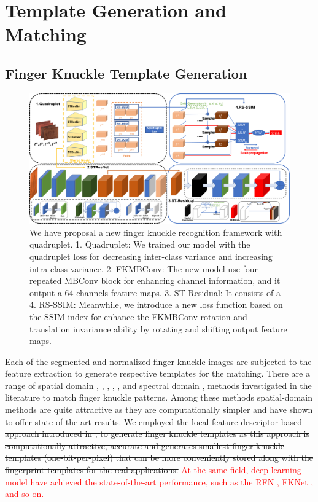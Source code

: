 \section{Template Generation and Matching\label{template-generation}}

\subsection{Finger Knuckle Template Generation\label{fk-template}}

\begin{figure}
    \centering
    \includegraphics[width=6.5in]{Figures/framework/ST-Residual/Framework.png}
    \caption{We have proposal a new finger knuckle recognition framework with quadruplet. 1. Quadruplet: We trained our model with the quadruplet loss \cite{chen2017beyond} for decreasing inter-class variance and increasing intra-class variance. 2. FKMBConv: The new model use four repeated MBConv block \cite{tan2021efficientnetv2} for enhancing channel information, and it output a 64 channels feature maps. 3. ST-Residual: It consists of a
     4. RS-SSIM: Meanwhile, we introduce a new loss function based on the SSIM index for enhance the FKMBConv rotation and translation invariance ability by rotating and shifting output feature maps.}
    \label{framework}
\end{figure}

Each of the segmented and normalized finger-knuckle images are subjected to the feature extraction to generate respective templates for the matching. There are a range of spatial domain \cite{sricharan2006knuckle}, \cite{kumar2009personal}, \cite{zhang2010online}, \cite{zhu2010multimodal}, \cite{zheng20163d}, \cite{kumar2016personal} and spectral domain \cite{aoyama2011finger}, \cite{kumar2015recovering} methods investigated in the literature to match finger knuckle patterns. Among these methods spatial-domain methods are quite attractive as they are computationally simpler and have shown to offer state-of-the-art results. \sout{We employed the local feature descriptor based approach introduced in \cite{zheng20163d}, \cite{kumar2016personal} to generate finger knuckle templates as this approach is computationally attractive, accurate and generates smallest finger-knuckle templates (one-bit-per-pixel) that can be more conveniently stored along with the fingerprint-templates for the real applications.} \textcolor{red}{At the same field, deep learning model have achieved the state-of-the-art performance, such as the RFN \cite{liu2020contactless}, FKNet \cite{cheng2020deep}, and so on.}

